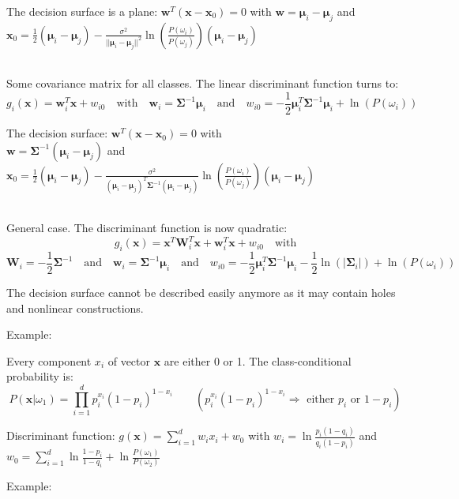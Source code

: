   The decision surface is a plane: $\mathbf{w}^T(\mathbf{x}-\mathbf{x}_0) = 0$ with $\mathbf{w} = \boldsymbol{\mu}_i - \boldsymbol{\mu}_j$ and 
  $\mathbf{x}_0 = \frac{1}{2}(\boldsymbol{\mu}_i-\boldsymbol{\mu}_j) - \frac{\sigma^2}{||\boldsymbol{\mu}_i-\boldsymbol{\mu}_j||^2} \ln\left(\frac{P(\omega_i)}{P(\omega_j)}\right) (\boldsymbol{\mu}_i-\boldsymbol{\mu}_j)$
  
  
  \\
  Some covariance matrix for all classes.
  The linear discriminant function turns to: 
  $$g_i(\mathbf{x}) = \mathbf{w}_i^T \mathbf{x} + w_{i0} \quad \text{with} \quad
  \mathbf{w}_i = \boldsymbol{\Sigma}^{-1}\boldsymbol{\mu}_i \quad \text{and} \quad
  w_{i0} = -\frac{1}{2} \boldsymbol{\mu}_i^T \boldsymbol{\Sigma}^{-1}\boldsymbol{\mu}_i + \ln(P(\omega_i))$$
  
  The decision surface: $\mathbf{w}^T(\mathbf{x}-\mathbf{x}_0) = 0$ \quad with \\
  $\mathbf{w} = \boldsymbol{\Sigma}^{-1} (\boldsymbol{\mu}_i - \boldsymbol{\mu}_j)$ \quad and \quad 
  $\mathbf{x}_0 = \frac{1}{2}(\boldsymbol{\mu}_i-\boldsymbol{\mu}_j) - \frac{\sigma^2}{(\boldsymbol{\mu}_i-\boldsymbol{\mu}_j)^T \boldsymbol{\Sigma}^{-1} (\boldsymbol{\mu}_i-\boldsymbol{\mu}_j)} \ln\left(\frac{P(\omega_i)}{P(\omega_j)}\right) (\boldsymbol{\mu}_i-\boldsymbol{\mu}_j)$
  
  
  \\
  General case.
  The discriminant function is now quadratic: 
  $$g_i(\mathbf{x}) = \mathbf{x}^T \mathbf{W}_i^T \mathbf{x} + \mathbf{w}_i^T \mathbf{x} +w_{i0} \quad\text{with}$$
  $$\mathbf{W}_i = -\frac{1}{2} \boldsymbol{\Sigma}^{-1} \quad\text{and}\quad
  \mathbf{w}_i = \boldsymbol{\Sigma}^{-1}\boldsymbol{\mu}_i \quad\text{and}\quad
  w_{i0} = -\frac{1}{2} \boldsymbol{\mu}_i^T\boldsymbol{\Sigma}^{-1}\boldsymbol{\mu}_i - \frac{1}{2}\ln(|\boldsymbol{\Sigma}_i|) + \ln(P(\omega_i))$$
  
  The decision surface cannot be described easily anymore as it may contain holes and nonlinear constructions.
  
  Example: 
  

  Every component $x_i$ of vector $\mathbf{x}$ are either 0 or 1. The class-conditional probability is:\\
  $$P(\mathbf{x}|\omega_1)=\prod\limits_{i=1}^d p_i^{x_i}(1-p_i)^{1-x_i} \qquad ( p_i^{x_i}(1-p_i)^{1-x_i} \Rightarrow\text{ either }p_i\text{ or }1-p_i)$$
  
  Discriminant function: $g(\bm x) = \sum\limits_{i=1}^d w_i x_i + w_0$ with 
  $w_i = \ln \frac{p_i(1-q_i)}{q_i(1-p_i)}$ and 
  $w_0 = \sum\limits_{i=1}^d \ln \frac{1-p_i}{1-q_i} + \ln \frac{P(\omega_1)}{P(\omega_2)}$
  
  Example: 